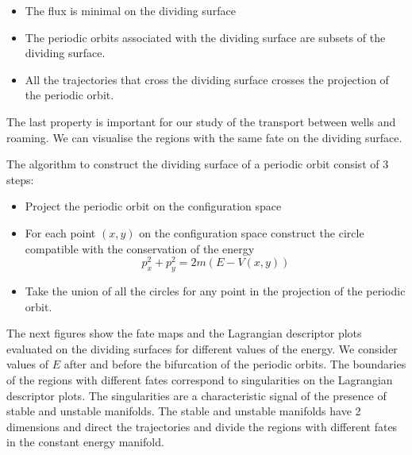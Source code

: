 \documentclass[10pt,aps,onecolumn,superscriptaddress]{revtex4-2}
\begin{document}
\begin{itemize}
    \item The flux is minimal on the dividing surface
    \item The periodic orbits associated with the dividing surface are  subsets of the dividing surface.
    \item All the trajectories that cross the dividing surface crosses the projection of the periodic orbit.
\end{itemize}

The last property is important for our study of the transport between wells and roaming. We can visualise the regions with the same fate on the dividing surface.

The algorithm to construct the dividing surface of a periodic orbit consist of 3 steps:

\begin{itemize}
    \item Project the periodic orbit on the configuration space
    \item For each point $(x,y)$ on the configuration space construct the circle compatible with the conservation of the energy
    \[ p^2_x + p^2_y =  2m(E - V(x,y)) \]
    \item Take the union of all the circles for any point in the projection of the periodic orbit.
\end{itemize}

The next figures show the fate maps and the Lagrangian descriptor plots evaluated on the dividing surfaces for different values of the energy. We consider values of $E$ after and before the bifurcation of the periodic orbits. The boundaries of the regions with different fates correspond to singularities on the Lagrangian descriptor plots. The singularities are a characteristic signal of the presence of stable and unstable manifolds. The stable and unstable manifolds have 2 dimensions and direct the trajectories and divide the regions with different fates in the constant energy manifold.
\end{document}
